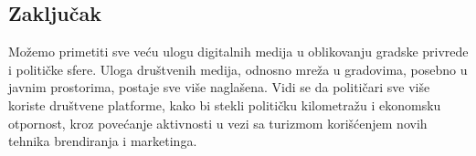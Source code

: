 \documentclass[a0,portrait]{a0poster}
\begin{document}
\begin{multicols}{2}
\color{SaddleBrown} %

\color{teal}

\section*{\huge{Zaključak}}

\Large{
Možemo primetiti sve veću ulogu digitalnih medija u
oblikovanju gradske privrede i političke sfere. Uloga društvenih medija, odnosno mreža u gradovima, posebno u javnim prostorima, postaje sve više naglašena. Vidi se da političari sve više koriste društvene platforme, kako bi stekli političku kilometražu i ekonomsku otpornost, kroz povećanje aktivnosti u vezi sa turizmom korišćenjem novih tehnika brendiranja i marketinga.
}

\end{multicols}
\end{document}
